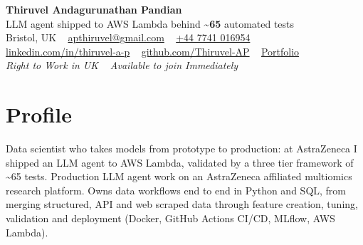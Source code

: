 \documentclass[a4paper,11pt]{article}
\newcommand{\num}[1]{\textbf{#1}}   %
\begin{document}
\begin{center}
  {\fontsize{22}{26}\selectfont\bfseries\color{navy} Thiruvel Andagurunathan Pandian}\\[4pt]
  {\fontsize{12}{14}\selectfont\color{navy} LLM agent shipped to AWS Lambda behind \num{\textasciitilde{}65} automated tests}\\[4pt]
  {\small
  Bristol, UK\nobreak\ \,\textperiodcentered\, \href{mailto:apthiruvel@gmail.com}{apthiruvel@gmail.com}\nobreak\ \,\textperiodcentered\, \href{tel:+447741016954}{+44 7741 016954}\nobreak\ \,\textperiodcentered\, \href{https://www.linkedin.com/in/thiruvel-a-p/}{linkedin.com/in/thiruvel-a-p}\nobreak\ \,\textperiodcentered\, \href{https://github.com/Thiruvel-AP}{github.com/Thiruvel-AP}\nobreak\ \,\textperiodcentered\, \href{https://thiruvel-ap.github.io/PersonalPortfolio/}{Portfolio}}\\[3pt]
  {\small\itshape\color{muted} Right to Work in UK\nobreak\ \,\textperiodcentered\, Available to join Immediately}

\end{center}

\section{Profile}
Data scientist who takes models from prototype to production: at AstraZeneca I shipped an LLM agent to AWS Lambda, validated by a three tier framework of \textasciitilde{}65 tests. Production LLM agent work on an AstraZeneca affiliated multiomics research platform. Owns data workflows end to end in Python and SQL, from merging structured, API and web scraped data through feature creation, tuning, validation and deployment (Docker, GitHub Actions CI/CD, MLflow, AWS Lambda).
\end{document}
